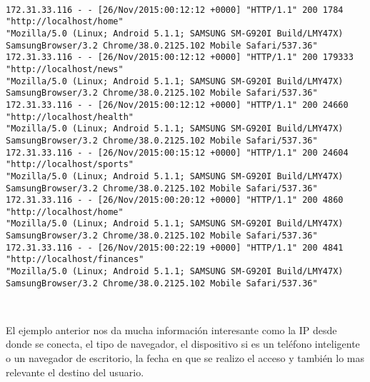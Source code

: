 \begin{lstlisting}[frame=single,basicstyle=\ttfamily\tiny,]

172.31.33.116 - - [26/Nov/2015:00:12:12 +0000] "HTTP/1.1" 200 1784 "http://localhost/home" 
"Mozilla/5.0 (Linux; Android 5.1.1; SAMSUNG SM-G920I Build/LMY47X) 
SamsungBrowser/3.2 Chrome/38.0.2125.102 Mobile Safari/537.36"
172.31.33.116 - - [26/Nov/2015:00:12:12 +0000] "HTTP/1.1" 200 179333 "http://localhost/news" 
"Mozilla/5.0 (Linux; Android 5.1.1; SAMSUNG SM-G920I Build/LMY47X) 
SamsungBrowser/3.2 Chrome/38.0.2125.102 Mobile Safari/537.36"
172.31.33.116 - - [26/Nov/2015:00:12:12 +0000] "HTTP/1.1" 200 24660 "http://localhost/health" 
"Mozilla/5.0 (Linux; Android 5.1.1; SAMSUNG SM-G920I Build/LMY47X) 
SamsungBrowser/3.2 Chrome/38.0.2125.102 Mobile Safari/537.36"
172.31.33.116 - - [26/Nov/2015:00:15:12 +0000] "HTTP/1.1" 200 24604 "http://localhost/sports" 
"Mozilla/5.0 (Linux; Android 5.1.1; SAMSUNG SM-G920I Build/LMY47X) 
SamsungBrowser/3.2 Chrome/38.0.2125.102 Mobile Safari/537.36"
172.31.33.116 - - [26/Nov/2015:00:20:12 +0000] "HTTP/1.1" 200 4860 "http://localhost/home" 
"Mozilla/5.0 (Linux; Android 5.1.1; SAMSUNG SM-G920I Build/LMY47X) 
SamsungBrowser/3.2 Chrome/38.0.2125.102 Mobile Safari/537.36"
172.31.33.116 - - [26/Nov/2015:00:22:19 +0000] "HTTP/1.1" 200 4841 "http://localhost/finances" 
"Mozilla/5.0 (Linux; Android 5.1.1; SAMSUNG SM-G920I Build/LMY47X) 
SamsungBrowser/3.2 Chrome/38.0.2125.102 Mobile Safari/537.36"

  	
  \end{lstlisting}

  El ejemplo anterior nos da mucha información interesante como la IP desde donde se conecta, el tipo de navegador, el dispositivo si es un teléfono inteligente o un navegador de escritorio, la fecha en que se realizo el acceso y también lo mas relevante el destino del usuario.